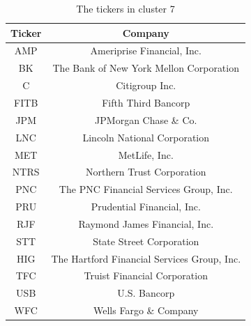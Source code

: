 \documentclass[10pt]{article}
\begin{document}
\begin{table}
    \centering
    \begin{tabular}{|c|c|}
        \hline 
        Ticker & Company \\
        \hline
        AMP & Ameriprise Financial, Inc. \\
        BK & The Bank of New York Mellon Corporation \\
        C & Citigroup Inc. \\
        FITB & Fifth Third Bancorp \\
        JPM & JPMorgan Chase \& Co. \\
        LNC & Lincoln National Corporation \\
        MET & MetLife, Inc. \\
        NTRS & Northern Trust Corporation \\
        PNC & The PNC Financial Services Group, Inc. \\
        PRU & Prudential Financial, Inc. \\
        RJF & Raymond James Financial, Inc. \\
        STT & State Street Corporation \\
        HIG & The Hartford Financial Services Group, Inc. \\
        TFC & Truist Financial Corporation \\
        USB & U.S. Bancorp \\
        WFC & Wells Fargo \& Company \\
        \hline
    \end{tabular}
    \caption{The tickers in cluster 7}
    \label{tab:clusters7}
\end{table}
\end{document}
